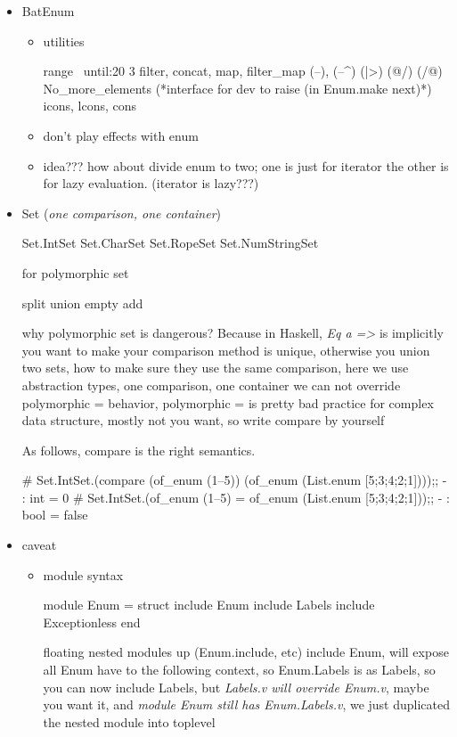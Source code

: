 
\begin{itemize}
\item BatEnum
  \begin{itemize}
  \item utilities


\begin{ocamlcode}
  range ~until:20 3
  filter, concat, map, filter_map
  (--), (--^) (|>) (@/) (/@)
  No_more_elements (*interface for dev to raise (in Enum.make next)*)
  icons, lcons, cons
\end{ocamlcode}

  \item don't play effects with enum
  \item idea??? how about divide enum to two; one is just for iterator
    the other is for lazy evaluation. (iterator is lazy???)
  \end{itemize}
\item Set (\emph{one comparison, one container})


\begin{ocamlcode}
Set.IntSet
Set.CharSet
Set.RopeSet
Set.NumStringSet
\end{ocamlcode}
for polymorphic set 

\begin{ocamlcode}
split
union
empty
add
\end{ocamlcode}
 why polymorphic set is dangerous? Because in Haskell, \textit{Eq a =>} is implicitly
 you want to make your comparison method is unique, otherwise you
 union two sets, how to make sure they use the same comparison, here
 we use abstraction types, one comparison, one container
 we can not override polymorphic = behavior, polymorphic = is pretty bad practice
 for complex data structure, mostly not you want, so write compare by yourself

As follows, compare is the right semantics.
\begin{alternate}
# Set.IntSet.(compare (of_enum (1--5))  (of_enum (List.enum [5;3;4;2;1])));;
- : int = 0
# Set.IntSet.(of_enum (1--5) = of_enum (List.enum [5;3;4;2;1]));;
- : bool = false
\end{alternate}


\item caveat
  \begin{itemize}
  \item module syntax

 \begin{ocamlcode}
module Enum = struct
  include Enum include Labels include Exceptionless
end
\end{ocamlcode}


    floating nested modules up (Enum.include, etc)
    include Enum, will expose all Enum have to the following context, so Enum.Labels
    is as Labels, so you can now include Labels, but \emph{Labels.v will override Enum.v},
    maybe you want it, and \emph{module Enum still has Enum.Labels.v}, we just duplicated
    the nested module into toplevel
  \end{itemize}
\end{itemize}

